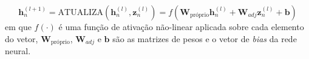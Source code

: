 \begin{equation}
    \mathbf{h}^{(l+1)}_n = \text{ATUALIZA}(\mathbf{h}^{(l)}_n, \mathbf{z}^{(l)}_n ) = f(\mathbf{W}_{\text{próprio}} \mathbf{h}^{(l)}_n + \mathbf{W}_{adj} \mathbf{z}^{(l)}_n + \mathbf{b})
\end{equation}
em que $f(\cdot)$ é uma função de ativação não-linear aplicada sobre cada
elemento do vetor, $\mathbf{W}_{\text{próprio}}$, $\mathbf{W}_{adj}$ e $\mathbf{b}$ são
as matrizes de pesos e o vetor de \textit{bias} da rede neural.




